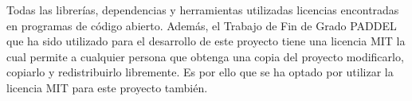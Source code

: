 
Todas las librerías, dependencias y herramientas utilizadas licencias encontradas en programas de código abierto. Además, el Trabajo de Fin de Grado PADDEL~\cite{paddelRepo} que ha sido utilizado para el desarrollo de este proyecto tiene una licencia MIT la cual permite a cualquier persona que obtenga una copia del proyecto modificarlo, copiarlo y redistribuirlo libremente. Es por ello que se ha optado por utilizar la licencia MIT para este proyecto también. 



